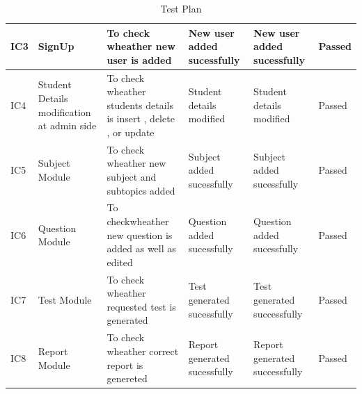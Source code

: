 \documentclass[oneside,a4paper,12pt]{report}
\begin{document}
\begin{table}[h]
\begin{tabular}{|p{0.7in}|p{0.7in}|p{1.2in}|p{0.8in}|p{0.8in}|p{0.5in}|}
\\
\hline	  
IC3	& SignUp & To check  \newline wheather new \newline user is added	& New user \newline added sucessfully &	New user \newline added sucessfully	& Passed  
\\
\hline	  
IC4	& Student Details modification at admin side	& To check  \newline wheather students details is insert , delete , or update	& Student details modified &	Student details modified &	Passed
\\
\hline	  
IC5 &	Subject Module &	To check \newline wheather new \newline subject and \newline subtopics added	& Subject added sucessfully &	Subject added sucessfully	 & Passed
\\
\hline	  
IC6 &	Question Module &	To check\newline wheather new \newline question is  \newline added as well as edited & Question added sucessfully & Question added sucessfully & Passed
\\
\hline	  
IC7 &	Test Module  &	To check \newline wheather \newline requested  \newline test is \newline generated	& Test generated sucessfully &	Test generated successfully	 & Passed
\\
\hline	  
IC8 &	Report Module &	To check \newline wheather correct \newline report is \newline genereted	& Report generated sucessfully &	Report generated successfully	 & Passed
\\

\hline
\end{tabular}
\caption{Test Plan}
\end{table}
\end{document}
